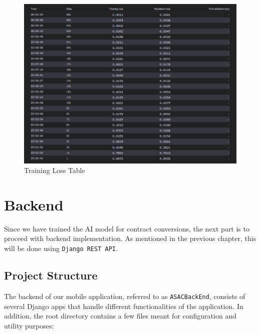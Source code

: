 \begin{figure}[!ht]
    \centering
    \includegraphics[width=1\textwidth]{LATEX/Appendices/Images/Software/AI Model/training_validation_loss_table.png}
    \caption{Training Loss Table}
    \label{fig:training_loss_table}
\end{figure}

\section{Backend}

Since we have trained the AI model for contract conversions, the next part is to proceed with backend implementation. As mentioned in the previous chapter, this will be done using \texttt{Django REST API}. 

\subsection{Project Structure}

The backend of our mobile application, referred to as \texttt{ASACBackEnd}, consists of several Django apps that handle different functionalities of the application. In addition, the root directory contains a few files meant for  configuration and utility purposes:

